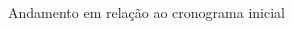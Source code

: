 \begin{frame}{Andamento em relação ao cronograma inicial}
\begin{adjustbox}{width=1.0\textwidth,center}
\begin{ganttchart}

\end{ganttchart}
\end{adjustbox}

\end{frame}